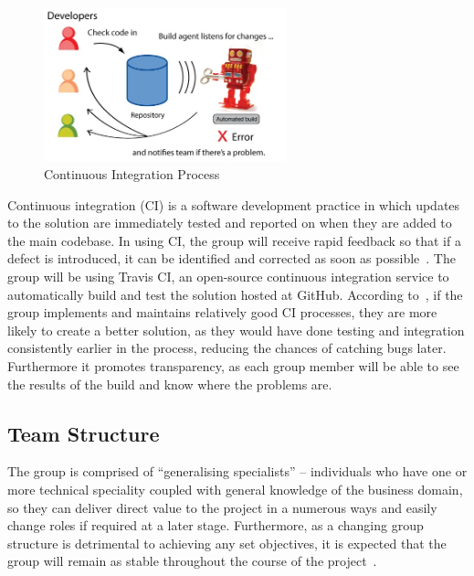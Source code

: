 \begin{figure}
  \centering
  \begin{minipage}{7cm}
    \centering
    \includegraphics[width=7cm]{inc/continuous_integration_process.jpg}
    \caption{Continuous Integration Process}
    \label{fig:continuous_integration_process}
  \end{minipage}
\end{figure}

Continuous integration (CI) is a software development practice in which updates to the solution are immediately tested and reported on when they are added to the main codebase. In using CI, the group will receive rapid feedback so that if a defect is introduced, it can be identified and corrected as soon as possible~\parencite{web:behaviour_driven_development}. The group will be using Travis CI, an open-source continuous integration service to automatically build and test the solution hosted at GitHub. According to~\textcite{book:ci_NET}, if the group implements and maintains relatively good CI processes, they are more likely to create a better solution, as they would have done testing and integration consistently earlier in the process, reducing the chances of catching bugs later. Furthermore it promotes transparency, as each group member will be able to see the results of the build and know where the problems are.

\subsection{Team Structure}

The group is comprised of ``generalising specialists'' -- individuals who have one or more technical speciality coupled with general knowledge of the business domain, so they can deliver direct value to the project in a numerous ways and easily change roles if required at a later stage. Furthermore, as a changing group structure is detrimental to achieving any set objectives, it is expected that the group will remain as stable throughout the course of the project~\parencite{book:agile_development}.
